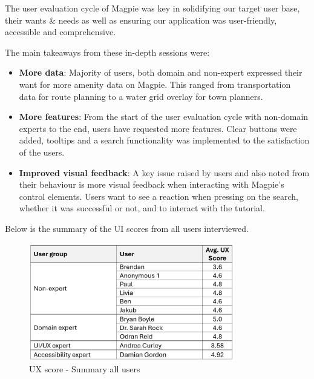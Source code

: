The user evaluation cycle of Magpie was key in solidifying our target user base,
their wants \& needs as well as ensuring our application was user-friendly,
accessible and comprehensive.

The main takeaways from these in-depth sessions were:
\begin{itemize}
    \item \textbf{More data}: Majority of users, both domain and non-expert
          expressed their want for more amenity data on Magpie. This ranged from
          transportation data for route planning to a water grid overlay for town
          planners.

    \item \textbf{More features}: From the start of the user evaluation cycle
          with non-domain experts to the end, users have requested more features.
          Clear buttons were added, tooltips and a search functionality was
          implemented to the satisfaction of the users.

    \item \textbf{Improved visual feedback}: A key issue raised by users and
          also noted from their behaviour is more visual feedback when interacting
          with Magpie's control elements. Users want to see a reaction when pressing
          on the search, whether it was successful or not, and to interact with the tutorial.
\end{itemize}

Below is the summary of the UI scores from all users interviewed.
\begin{figure}[h!]
    \centering
    \includegraphics[width=0.8\textwidth]{images/ux-score-summary.png}
    \caption{UX score - Summary all users}
\end{figure}
